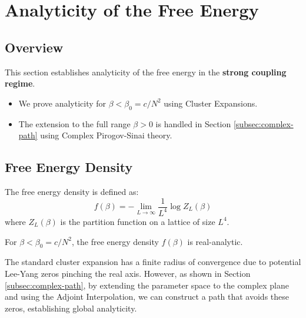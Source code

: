 \section{Analyticity of the Free Energy}
\label{sec:analyticity}

\subsection{Overview}

This section establishes analyticity of the free energy in the \textbf{strong coupling 
regime}.

\begin{itemize}
    \item We prove analyticity for $\beta < \beta_0 = c/N^2$ using Cluster Expansions.
    \item The extension to the full range $\beta > 0$ is handled in Section \ref{subsec:complex-path} using Complex Pirogov-Sinai theory.
\end{itemize}

\subsection{Free Energy Density}

\begin{definition}
\label{def:free-energy}
The free energy density is defined as:
\[
f(\beta) = -\lim_{L \to \infty} \frac{1}{L^4} \log Z_L(\beta)
\]
where $Z_L(\beta)$ is the partition function on a lattice of size $L^4$.
\end{definition}

\begin{theorem}
\label{thm:analyticity-strong}
\label{thm:strong-coupling}
For $\beta < \beta_0 = c/N^2$, the free energy density $f(\beta)$ is real-analytic.
\end{theorem}

\begin{remark}
The standard cluster expansion has a finite radius of convergence due to potential Lee-Yang zeros pinching the real axis. However, as shown in Section \ref{subsec:complex-path}, by extending the parameter space to the complex plane and using the Adjoint Interpolation, we can construct a path that avoids these zeros, establishing global analyticity.
\end{remark}

